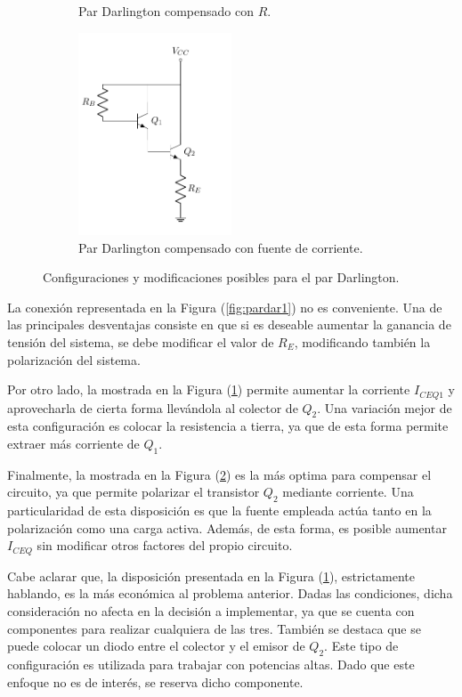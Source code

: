 \begin{figure}[H]
\begin{subfigure}{.4\textwidth}
	\caption{Par Darlington compensado con $R$.}
	\label{fig:pardar2}
\end{subfigure}
\begin{subfigure}{.5\textwidth}
\centering
	\includegraphics[width=0.5\textwidth, page=3]{Imagenes/ParDarlington.pdf}
	\caption{Par Darlington compensado con fuente de corriente.}
	\label{fig:pardar3}
\end{subfigure}
\caption{Configuraciones y modificaciones posibles para el par Darlington.}
\label{fig:pardar}
\end{figure}

La conexión representada en la Figura (\ref{fig:pardar1}) no es conveniente. Una de las principales desventajas consiste en que si es deseable aumentar la ganancia de tensión del sistema, se debe modificar el valor de $R_E$, modificando también la polarización del sistema.

Por otro lado, la mostrada en la Figura (\ref{fig:pardar2}) permite aumentar la corriente $I_{CEQ1}$ y aprovecharla de cierta forma llevándola al colector de $Q_2$. Una variación mejor de esta configuración es colocar la resistencia a tierra, ya que de esta forma permite extraer más corriente de $Q_1$.

Finalmente, la mostrada en la Figura (\ref{fig:pardar3}) es la más optima para compensar el circuito, ya que permite polarizar el transistor $Q_2$ mediante corriente. Una particularidad de esta disposición es que la fuente empleada actúa tanto en la polarización como una carga activa. Además, de esta forma, es posible aumentar $I_{CEQ}$ sin modificar otros factores del propio circuito.

Cabe aclarar que, la disposición presentada en la Figura (\ref{fig:pardar2}), estrictamente hablando, es la más económica al problema anterior. Dadas las condiciones, dicha consideración no afecta en la decisión a implementar, ya que se cuenta con componentes para realizar cualquiera de las tres. También se destaca que se puede colocar un diodo entre el colector y el emisor de $Q_2$. Este tipo de configuración es utilizada para trabajar con potencias altas. Dado que este enfoque no es de interés, se reserva dicho componente.

